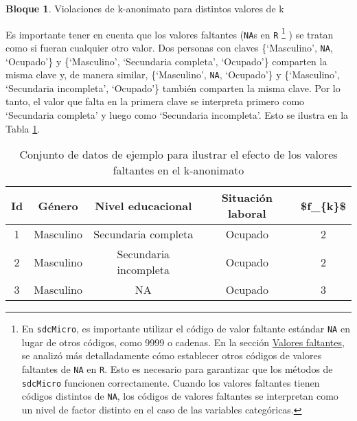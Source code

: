 \documentclass[
]{book}
\newenvironment{Shaded}{\begin{snugshade}}{\end{snugshade}}
\newcommand{\DecValTok}[1]{\textcolor[rgb]{0.00,0.00,0.81}{#1}}
\newcommand{\FunctionTok}[1]{\textcolor[rgb]{0.00,0.00,0.00}{#1}}
\newcommand{\NormalTok}[1]{#1}
\newcommand{\OtherTok}[1]{\textcolor[rgb]{0.56,0.35,0.01}{#1}}
\newcommand{\SpecialCharTok}[1]{\textcolor[rgb]{0.00,0.00,0.00}{#1}}
\theoremstyle{definition}
\theoremstyle{definition}
\newtheorem{example}{Bloque}[chapter]
\theoremstyle{definition}
\theoremstyle{definition}
\theoremstyle{remark}
\begin{document}
\begin{example}
\protect\hypertarget{exm:bloqueMR5}{}\label{exm:bloqueMR5}Violaciones de k-anonimato para distintos valores de k
\end{example}

\begin{Shaded}
\end{Shaded}

Es importante tener en cuenta que los valores faltantes (\texttt{NA}s en \texttt{R} \footnote{En \texttt{sdcMicro}, es importante utilizar el código de valor faltante estándar \texttt{NA} en lugar de otros códigos, como 9999 o cadenas. En la sección \protect\hyperlink{valores-faltantes}{Valores faltantes}, se analizó más detalladamente cómo establecer otros códigos de valores faltantes de \texttt{NA} en \texttt{R}. Esto es necesario para garantizar que los métodos de \texttt{sdcMicro} funcionen correctamente. Cuando los valores faltantes tienen códigos distintos de \texttt{NA}, los códigos de valores faltantes se interpretan como un nivel de factor distinto en el caso de las variables categóricas.} ) se tratan como si fueran cualquier otro valor. Dos personas con claves \{`Masculino', \texttt{NA}, `Ocupado'\} y \{`Masculino', `Secundaria completa', `Ocupado'\} comparten la misma clave y, de manera similar, \{`Masculino', \texttt{NA}, `Ocupado'\} y \{`Masculino', `Secundaria incompleta', `Ocupado'\} también comparten la misma clave. Por lo tanto, el valor que falta en la primera clave se interpreta primero como `Secundaria completa' y luego como `Secundaria incompleta'. Esto se ilustra en la Tabla \ref{tab:tabMR2}.

\begin{table}

\caption{\label{tab:tabMR2}Conjunto de datos de ejemplo para ilustrar el efecto de los valores faltantes en el k-anonimato}
\centering
\begin{tabular}[t]{c|c|c|c|c}
\hline
Id & Género & Nivel educacional & Situación laboral & \$f\_\{k\}\$\\
\hline
1 & Masculino & Secundaria completa & Ocupado & 2\\
\hline
2 & Masculino & Secundaria incompleta & Ocupado & 2\\
\hline
3 & Masculino & NA & Ocupado & 3\\
\hline
\end{tabular}
\end{table}
\end{document}
